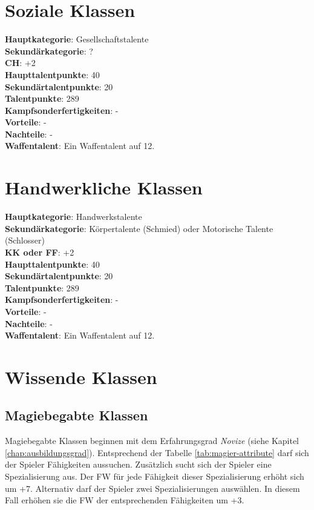 \section{Soziale Klassen}
\textbf{Hauptkategorie}: Gesellschaftstalente \\
\textbf{Sekundärkategorie}: ? \\
\textbf{CH}: +2 \\
\textbf{Haupttalentpunkte}: 40 \\
\textbf{Sekundärtalentpunkte}: 20 \\
\textbf{Talentpunkte}: 289 \\
\textbf{Kampfsonderfertigkeiten}: - \\
\textbf{Vorteile}: - \\
\textbf{Nachteile}: - \\
\textbf{Waffentalent}: Ein Waffentalent auf 12.

\section{Handwerkliche Klassen}
\textbf{Hauptkategorie}: Handwerkstalente \\
\textbf{Sekundärkategorie}: Körpertalente (Schmied) oder Motorische Talente (Schlosser) \\
\textbf{KK oder FF}: +2 \\
\textbf{Haupttalentpunkte}: 40 \\
\textbf{Sekundärtalentpunkte}: 20 \\
\textbf{Talentpunkte}: 289 \\
\textbf{Kampfsonderfertigkeiten}: - \\
\textbf{Vorteile}: - \\
\textbf{Nachteile}: - \\
\textbf{Waffentalent}: Ein Waffentalent auf 12.

\section{Wissende Klassen}
\subsection{Magiebegabte Klassen}
Magiebegabte Klassen beginnen mit dem Erfahrungsgrad \textit{Novize} (siehe Kapitel \ref{chap:ausbildungsgrad}). Entsprechend der Tabelle \ref{tab:magier-attribute} darf sich der Spieler Fähigkeiten aussuchen. Zusätzlich sucht sich der Spieler eine Spezialisierung aus. Der FW für jede Fähigkeit dieser Spezialisierung erhöht sich um +7. Alternativ darf der Spieler zwei Spezialisierungen auswählen. In diesem Fall erhöhen sie die FW der entsprechenden Fähigkeiten um +3.

